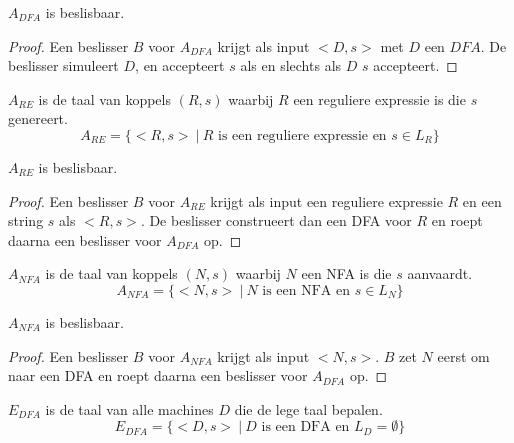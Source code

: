 \documentclass[main.tex]{subfiles}
\begin{document}
\begin{st}
  \label{st:a-dfa-besl}
  $A_{DFA}$ is beslisbaar.

  \begin{proof}
    Een beslisser $B$ voor $A_{DFA}$ krijgt als input $<D,s>$ met $D$ een $DFA$.
    De beslisser simuleert $D$, en accepteert $s$ als en slechts als $D$ $s$ accepteert.
  \end{proof}
\end{st}

\begin{de}
  \label{de:a-re}
  $A_{RE}$ is de taal van koppels $(R,s)$ waarbij $R$ een reguliere expressie is die $s$ genereert.
  \[ A_{RE} = \{ <R,s> \ |\ R \text{ is een reguliere expressie en } s \in L_{R} \} \]
\end{de}

\begin{st}
  \label{st:a-re-besl}
  $A_{RE}$ is beslisbaar.

  \begin{proof}
    Een beslisser $B$ voor $A_{RE}$ krijgt als input een reguliere expressie $R$ en een string $s$ als $<R,s>$.
    De beslisser construeert dan een DFA voor $R$ en roept daarna een beslisser voor $A_{DFA}$ op.
  \end{proof}
\end{st}

\begin{de}
  \label{de:a-nfa}
  $A_{NFA}$ is de taal van koppels $(N,s)$ waarbij $N$ een NFA is die $s$ aanvaardt.
  \[ A_{NFA} = \{ <N,s> \ |\ N \text{ is een NFA en } s \in L_{N} \} \]
\end{de}

\begin{st}
  \label{st-a-nfa-besl}
  $A_{NFA}$ is beslisbaar.

  \begin{proof}
    Een beslisser $B$ voor $A_{NFA}$ krijgt als input $<N,s>$.
    $B$ zet $N$ eerst om naar een DFA en roept daarna een beslisser voor $A_{DFA}$ op.
  \end{proof}
\end{st}

\begin{de}
  \label{de:e-dfa}
  $E_{DFA}$ is de taal van alle machines $D$ die de lege taal bepalen.
  \[ E_{DFA} = \{ <D,s>\ |\ D \text{ is een DFA en } L_{D} = \emptyset \} \]
\end{de}
\end{document}
